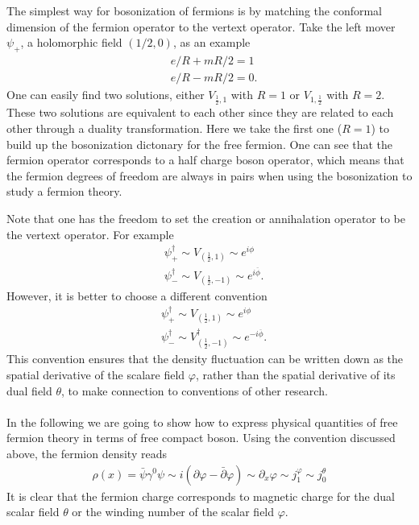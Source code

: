 The simplest way for bosonization of fermions is by matching the conformal dimension of the fermion operator to the vertext operator. Take the left mover $\psi_{+}$, a holomorphic field $\left(1/2,0\right)$, as an example
\begin{equation}
	\begin{aligned}
		&e/R + mR/2 = 1\\
		&e/R - mR/2 = 0.
	\end{aligned}
\end{equation}
One can easily find two solutions, either $V_{\frac{1}{2},1}$ with $R=1$ or $V_{1,\frac{1}{2}}$ with $R=2$. These two solutions are equivalent to each other since they are related to each other through a duality transformation. Here we take the first one ($R=1$) to build up the bosonization dictonary for the free fermion. One can see that the fermion operator corresponds to a half charge boson operator, which means that the fermion degrees of freedom are always in pairs when using the bosonization to study a fermion theory.

Note that one has the freedom to set the creation or annihalation operator to be the vertext operator. For example
\begin{equation}
	\begin{aligned}
		&\psi^{\dagger}_{+} \sim V_{(\frac{1}{2},1)} \sim e^{i \phi} \\
		&{\psi}^{\dagger}_{-} \sim V_{(\frac{1}{2},-1)} \sim e^{i\overline{\phi}}.
	\end{aligned}
\end{equation}
However, it is better to choose a different convention
\begin{equation}
	\begin{aligned}
		&\psi^{\dagger}_{+} \sim V_{(\frac{1}{2},1)} \sim e^{i \phi} \\
		&{\psi}^{\dagger}_{-} \sim V_{(\frac{1}{2},-1)}^\dagger \sim e^{-i\overline{\phi}}.
	\end{aligned}
\end{equation}
This convention ensures that the density fluctuation can be written down as the spatial derivative of the scalare field $\varphi$, rather than the spatial derivative of its dual field $\theta$, to make connection to conventions of other research.\\

 \\
In the following we are going to show how to express physical quantities of free fermion theory in terms of free compact boson. Using the convention discussed above, the fermion density reads
\begin{equation}
	\begin{aligned}
		\rho(x) = \bar{\psi} \gamma^0 \psi \sim i \left(\partial \varphi - \bar{\partial} \varphi\right) \sim \partial_x \varphi \sim j_1^\varphi \sim j_0^\theta  
	\end{aligned}
\end{equation}
It is clear that the fermion charge corresponds to magnetic charge for the dual scalar field $\theta$ or the winding number of the scalar field $\varphi$. 

